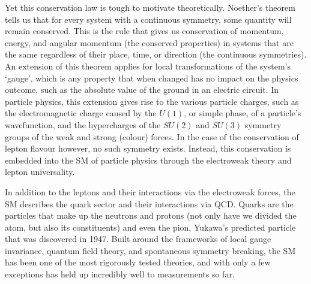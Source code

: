 Yet this conservation law is tough to motivate theoretically.
Noether's theorem tells us that for every system with a continuous symmetry, some quantity will remain conserved.
This is the rule that gives us conservation of momentum, energy, and angular momentum (the conserved properties) in systems that are the same regardless of their place, time, or direction (the continuous symmetries).
An extension of this theorem applies for local transformations of the system's `gauge', which is any property that when changed has no impact on the physics outcome, such as the absolute value of the ground in an electric circuit.
In particle physics, this extension gives rise to the various particle charges, such as the electromagnetic charge caused by the $U(1)$, or simple phase, of a particle's wavefunction, and the hypercharges of the $SU(2)$ and $SU(3)$ symmetry groups of the weak and strong (colour) forces.
In the case of the conservation of lepton flavour however, no such symmetry exists.
Instead, this conservation is embedded into the \ac{SM} of particle physics through the electroweak theory and lepton universality.

In addition to the leptons and their interactions via the electroweak forces, the \ac{SM} describes the quark sector and their interactions via \ac{QCD}.
Quarks are the particles that make up the neutrons and protons (not only have we divided the atom, but also its constituents) and even the pion, Yukawa's predicted particle that was discovered in 1947.
Built around the frameworks of local gauge invariance, quantum field theory, and spontaneous symmetry breaking, the \ac{SM} has been one of the most rigorously tested theories, and with only a few exceptions has held up incredibly well to measurements so far.

